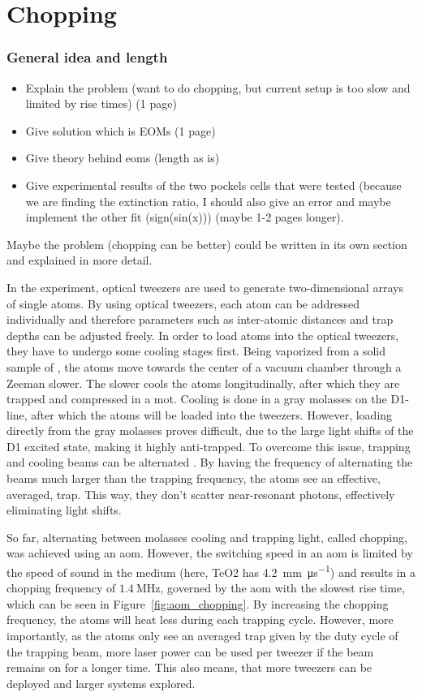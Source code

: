 \chapter{Chopping}

\subsection*{General idea and length}
\begin{itemize}
	\item Explain the problem (want to do chopping, but current setup is too slow and limited by rise times) (1 page)
	\item Give solution which is EOMs (1 page)
	\item Give theory behind eoms (length as is)
	\item Give experimental results of the two pockels cells that were tested (because we are finding the extinction ratio, I should also give an error and maybe implement the other fit (sign(sin(x))) (maybe 1-2 pages longer).
\end{itemize}
Maybe the problem (chopping can be better) could be written in its own section and explained in more detail.

In the experiment, optical tweezers are used to generate two-dimensional arrays of single atoms. By using optical tweezers, each atom can be addressed individually and therefore parameters such as inter-atomic distances and trap depths can be adjusted freely. In order to load atoms into the optical tweezers, they have to undergo some cooling stages first. Being vaporized from a solid sample of , the atoms move towards the center of a vacuum chamber through a Zeeman slower. The slower cools the atoms longitudinally, after which they are trapped and compressed in a \ac{mot}. Cooling is done in a gray molasses on the D1-line, after which the atoms will be loaded into the tweezers. However, loading directly from the gray molasses proves difficult, due to the large light shifts of the D1 excited state, making it highly anti-trapped. To overcome this issue, trapping and cooling beams can be alternated \cite{Hutzler2017}. By having the frequency of alternating the beams much larger than the trapping frequency, the atoms see an effective, averaged, trap. This way, they don't scatter near-resonant photons, effectively eliminating light shifts.

So far, alternating between molasses cooling and trapping light, called chopping, was achieved using an \ac{aom}. However, the switching speed in an \ac{aom} is limited by the speed of sound in the medium (here, TeO2 has \SI{4.2}{\milli\meter\per\micro\second}) and results in a chopping frequency of $\SI{1.4}{\mega\hertz}$, governed by the \ac{aom} with the slowest rise time, which can be seen in Figure~\ref{fig:aom_chopping}. By increasing the chopping frequency, the atoms will heat less during each trapping cycle. However, more importantly, as the atoms only see an averaged trap given by the duty cycle of the trapping beam, more laser power can be used per tweezer if the beam remains on for a longer time. This also means, that more tweezers can be deployed and larger systems explored.

